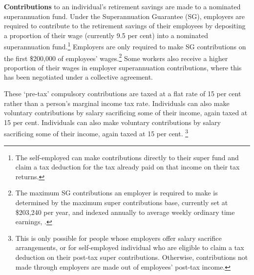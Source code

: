 \begin{figure}[t]
\begin{minipage}[t]{0.30\columnwidth}
\end{minipage}
\end{figure}

\textbf{Contributions} to an individual’s retirement savings are made to a nominated superannuation fund. Under the Superannuation Guarantee (SG), employers are required to contribute to the retirement savings of their employees by depositing a proportion of their wage (currently 9.5 per cent) into a nominated superannuation fund.\footnote{The self-employed can make contributions directly to their super fund and claim a tax deduction for the tax already paid on that income on their tax returns.} Employers are only required to make SG contributions on the first \$200,000 of employees’ wages.\footnote{The maximum SG contributions an employer is required to make is determined by the maximum super contributions base, currently set at \$203,240 per year, and indexed annually to average weekly ordinary time earnings, \textcite{ATO2015MaxSuperContrBase}.} Some workers also receive a higher proportion of their wages in employer superannuation contributions, where this has been negotiated under a collective agreement.


These ‘pre-tax’ compulsory contributions are taxed at a flat rate of 15 per cent rather than a person’s marginal income tax rate. Individuals can also make voluntary contributions by salary sacrificing some of their income, again taxed at 15 per cent. Individuals can also make voluntary contributions by salary sacrificing some of their income, again taxed at 15 per cent.%
\footnote{%
This is only possible for people whose employers offer salary sacrifice arrangements, or for self-employed individual who are eligible to claim a tax deduction on their post-tax super contributions. Otherwise, contributions not made through employers are made out of employees’ post-tax income.%
}  

